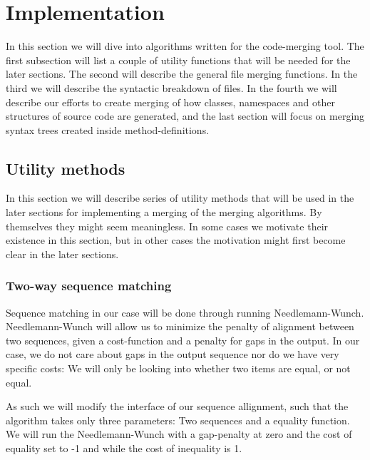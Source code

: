 \documentclass[11pt]{article}
\begin{document}
\clearpage

\section{Implementation}
In this section we will dive into algorithms written for the code-merging tool. The first subsection will list a couple of utility functions that will be needed for the later sections. The second will describe the general file merging functions. In the third we will describe the syntactic breakdown of files. In the fourth we will describe our efforts to create merging of how classes, namespaces and other structures of source code are generated, and the last section will focus on merging syntax trees created inside method-definitions.

\subsection{Utility methods}
In this section we will describe series of utility methods that will be used in the later sections for implementing a merging of the merging algorithms. By themselves they might seem meaningless. In some cases we motivate their existence in this section, but in other cases the motivation might first become clear in the later sections.

\subsubsection{Two-way sequence matching}
Sequence matching in our case will be done through running Needlemann-Wunch. Needlemann-Wunch will allow us to minimize the penalty of alignment between two sequences, given a cost-function and a penalty for gaps in the output. In our case, we do not care about gaps in the output sequence nor do we have very specific costs: We will only be looking into whether two items are equal, or not equal.

As such we will modify the interface of our sequence allignment, such that the algorithm takes only three parameters: Two sequences and a equality function. We will run the Needlemann-Wunch with a gap-penalty at zero and the cost of equality set to -1 and while the cost of inequality is 1.
\end{document}
